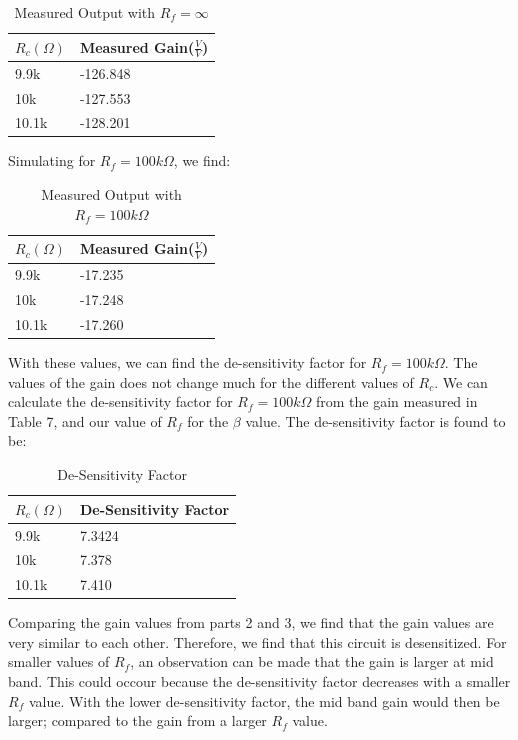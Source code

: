 \documentclass[12pt]{article}
\begin{document}
\begin{table}[h!]
    \centering
    \begin{tabular}{ll}
    $R_c(\Omega)$ & Measured Gain($\frac{V}{V}$) \\ \hline
    9.9k & -126.848 \\ 
    10k & -127.553 \\
    10.1k & -128.201
    \end{tabular}
    \caption{Measured Output with $R_f=\infty$}
    \label{measuredoutinf}
\end{table}
\FloatBarrier

Simulating for $R_f=100k\Omega$, we find:

\begin{table}[h!]
    \centering
    \begin{tabular}{ll}
    $R_c(\Omega)$ & Measured Gain($\frac{V}{V}$) \\ \hline
    9.9k & -17.235 \\ 
    10k & -17.248 \\
    10.1k & -17.260
    \end{tabular}
    \caption{Measured Output with $R_f=100k\Omega$}
    \label{measuredout}
\end{table}
\FloatBarrier 

With these values, we can find the de-sensitivity factor for $R_f=100k\Omega$. The values of the 
gain does not change much for the different values of $R_c$. We can calculate the de-sensitivity factor  for $R_f=100k\Omega$ 
from the gain measured in Table 7, and our value of $R_f$ for the $\beta$ value. The de-sensitivity factor is found to be:

\begin{table}[h!]
    \centering
    \begin{tabular}{ll}
    $R_c(\Omega)$ & De-Sensitivity Factor \\ \hline
    9.9k & 7.3424 \\ 
    10k & 7.378 \\
    10.1k & 7.410
    \end{tabular}
    \caption{De-Sensitivity Factor}
    \label{desens}
\end{table}
\FloatBarrier

Comparing the gain values from parts 2 and 3, we 
find that the gain values are very similar to each other. Therefore, we find that this 
circuit is desensitized. For smaller values of $R_f$, an observation can be made that the gain is larger at mid band.
This could occour because the de-sensitivity factor decreases with a smaller $R_f$ value. With the lower de-sensitivity 
factor, the mid band gain would then be larger; compared to the gain from a larger $R_f$ value. 
\end{document}
